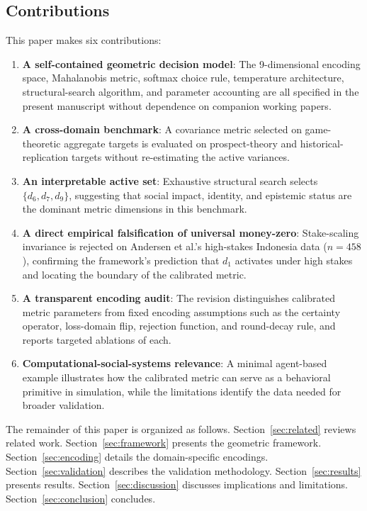 \documentclass[journal]{IEEEtran}
\begin{document}
\subsection{Contributions}
This paper makes six contributions:
\begin{enumerate}
    \item \textbf{A self-contained geometric decision model}: The 9-dimensional encoding space, Mahalanobis metric, softmax choice rule, temperature architecture, structural-search algorithm, and parameter accounting are all specified in the present manuscript without dependence on companion working papers.
    \item \textbf{A cross-domain benchmark}: A covariance metric selected on game-theoretic aggregate targets is evaluated on prospect-theory and historical-replication targets without re-estimating the active variances.
    \item \textbf{An interpretable active set}: Exhaustive structural search selects $\{d_6,d_7,d_9\}$, suggesting that social impact, identity, and epistemic status are the dominant metric dimensions in this benchmark.
    \item \textbf{A direct empirical falsification of universal money-zero}: Stake-scaling invariance is rejected on Andersen et al.'s high-stakes Indonesia data ($n{=}458$), confirming the framework's prediction that $d_1$ activates under high stakes and locating the boundary of the calibrated metric.
    \item \textbf{A transparent encoding audit}: The revision distinguishes calibrated metric parameters from fixed encoding assumptions such as the certainty operator, loss-domain flip, rejection function, and round-decay rule, and reports targeted ablations of each.
    \item \textbf{Computational-social-systems relevance}: A minimal agent-based example illustrates how the calibrated metric can serve as a behavioral primitive in simulation, while the limitations identify the data needed for broader validation.
\end{enumerate}

The remainder of this paper is organized as follows.
Section~\ref{sec:related} reviews related work.
Section~\ref{sec:framework} presents the geometric framework.
Section~\ref{sec:encoding} details the domain-specific encodings.
Section~\ref{sec:validation} describes the validation methodology.
Section~\ref{sec:results} presents results.
Section~\ref{sec:discussion} discusses implications and limitations.
Section~\ref{sec:conclusion} concludes.
\end{document}
